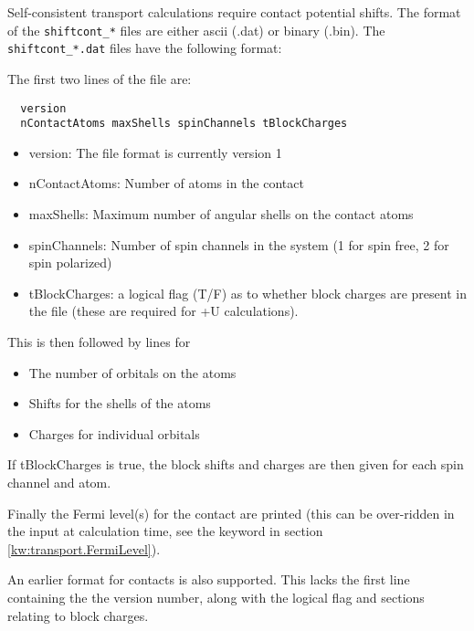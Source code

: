 Self-consistent transport calculations require contact potential shifts. The
format of the \verb|shiftcont_*| files are either ascii (.dat) or binary
(.bin). The \verb|shiftcont_*.dat| files have the following format:

The first two lines of the file are:
\begin{verbatim}
  version
  nContactAtoms maxShells spinChannels tBlockCharges
\end{verbatim}

\begin{itemize}
\item version: The file format is currently version 1
\item nContactAtoms: Number of atoms in the contact
\item maxShells: Maximum number of angular shells on the contact atoms
\item spinChannels: Number of spin channels in the system (1 for spin free, 2
  for spin polarized)
\item tBlockCharges: a logical flag (T/F) as to whether block charges are
  present in the file (these are required for +U calculations).
\end{itemize}
This is then followed by lines for
\begin{itemize}
\item The number of orbitals on the atoms
\item Shifts for the shells of the atoms
\item Charges for individual orbitals
\end{itemize}

If tBlockCharges is true, the block shifts and charges are then given for each
spin channel and atom.

Finally the Fermi level(s) for the contact are printed (this can be over-ridden
in the input at calculation time, see the  keyword in section
\ref{kw:transport.FermiLevel}).

An earlier format for contacts is also supported. This lacks the first line
containing the the version number, along with the logical flag and sections
relating to block charges.
